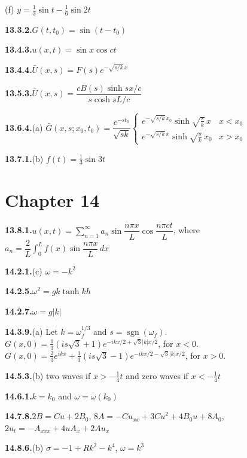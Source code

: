 \quad (f) $y = \frac{1}{3}\sin t - \frac{1}{6}\sin 2t$

\medskip
\textbf{13.3.2.}\quad $G(t,t_0) = \sin(t-t_0)$

\medskip
\textbf{13.4.3.}\quad $u(x,t) = \sin x\cos ct$

\medskip
\textbf{13.4.4.}\quad $\bar{U}(x,s) = F(s)e^{-\sqrt{s/k}\,x}$

\medskip
\textbf{13.5.3.}\quad $\bar{U}(x,s) = \dfrac{cB(s)\sinh sx/c}{s\cosh sL/c}$

\medskip
\textbf{13.6.4.}\quad (a) $\bar{G}(x,s;x_0,t_0) = \dfrac{e^{-st_0}}{\sqrt{sk}}\begin{cases} e^{-\sqrt{s/k}\,x_0}\sinh\sqrt{\frac{s}{k}}\,x & x < x_0 \\[6pt] e^{-\sqrt{s/k}\,x}\sinh\sqrt{\frac{s}{k}}\,x_0 & x > x_0 \end{cases}$

\medskip
\textbf{13.7.1.}\quad (b) $f(t) = \frac{1}{3}\sin 3t$

\section*{Chapter 14}

\textbf{13.8.1.}\quad $u(x,t) = \sum_{n=1}^{\infty}a_n\sin\dfrac{n\pi x}{L}\cos\dfrac{n\pi ct}{L}$, where $a_n = \dfrac{2}{L}\int_0^L f(x)\sin\dfrac{n\pi x}{L}\,dx$

\medskip
\textbf{14.2.1.}\quad (c) $\omega = -k^2$

\medskip
\textbf{14.2.5.}\quad $\omega^2 = gk\tanh kh$

\medskip
\textbf{14.2.7.}\quad $\omega = g|k|$

\medskip
\textbf{14.3.9.}\quad (a) Let $k = \omega_f^{1/3}$ and $s = \operatorname{sgn}(\omega_f)$. $G(x,0) = \frac{1}{3}(is\sqrt{3}+1)e^{-ikx/2+\sqrt{3}|k|x/2}$,
for $x < 0$. $G(x,0) = \frac{2}{3}e^{ikx}+\frac{1}{3}(is\sqrt{3}-1)e^{-ikx/2-\sqrt{3}|k|x/2}$, for $x > 0$.

\medskip
\textbf{14.5.3.}\quad (b) two waves if $x > -\frac{1}{4}t$ and zero waves if $x < -\frac{1}{4}t$

\medskip
\textbf{14.6.1.}\quad $k = k_0$ and $\omega = \omega(k_0)$

\medskip
\textbf{14.7.8.}\quad $2B = Cu + 2B_0$, $8A = -Cu_{xx}+3Cu^2+4B_0 u + 8A_0$,
$2u_t = -A_{xxx}+4uA_x+2Au_x$

\medskip
\textbf{14.8.6.}\quad (b) $\sigma = -1 + Rk^2 - k^4$, $\omega = k^3$

